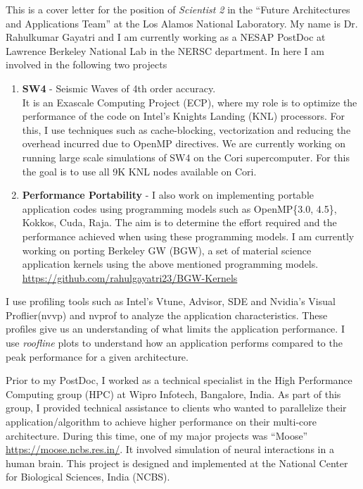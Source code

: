 \documentclass[10pt,stdletter,dateno]{newlfm}
\begin{document}
\begin{newlfm}
%
    This is a cover letter for the position of \textit{Scientist 2} in the \enquote{Future Architectures and Applications Team} at the Los Alamos National Laboratory.
    My name is Dr. Rahulkumar Gayatri and I am currently working as a NESAP PostDoc at Lawrence Berkeley National Lab in the NERSC department.
    In here I am involved in the following two projects
\begin{enumerate}
    \item {\bf SW4} - Seismic Waves of 4th order accuracy. \\
        It is an Exascale Computing Project (ECP), where my role is to optimize the  performance of the code on Intel's Knights Landing (KNL) processors.
        For this, I use techniques such as cache-blocking, vectorization and reducing the overhead incurred due to OpenMP directives.
        We are currently working on running large scale simulations of SW4 on the Cori supercomputer. For this the goal is to use all 9K KNL nodes available on Cori.
%
    \item {\bf Performance Portability} - I also work on implementing portable application codes using programming models such as OpenMP\{3.0, 4.5\}, Kokkos, Cuda, Raja.
        The aim is to determine the effort required and the performance achieved when using these programming models.
        I am currently working on porting Berkeley GW (BGW), a set of material science application kernels using the above mentioned programming models.
        \url{https://github.com/rahulgayatri23/BGW-Kernels}
\end{enumerate}
    I use profiling tools such as Intel's Vtune, Advisor, SDE and Nvidia's Visual Proflier(nvvp) and nvprof to analyze the application characteristics.
    These profiles give us an understanding of what limits the application performance.
    I use {\it roofline} plots to understand how an application performs compared to the peak performance for a given architecture.
%
    \par
    Prior to my PostDoc, I worked as a technical specialist in the High Performance Computing group (HPC) at Wipro Infotech, Bangalore, India.
    As part of this group, I provided technical assistance to clients who wanted to parallelize their application/algorithm to achieve higher performance on their multi-core architecture.
    During this time, one of my major projects was \enquote{Moose} \url{https://moose.ncbs.res.in/}.
    It involved simulation of neural interactions in a human brain.
    This project is designed and implemented at the National Center for Biological Sciences, India (NCBS).

\end{newlfm}
\end{document}
